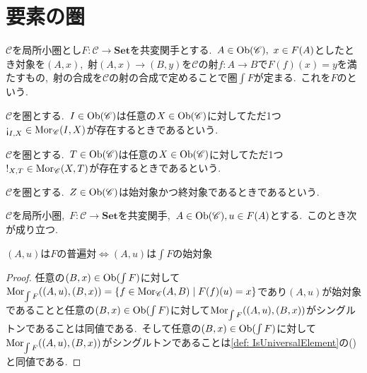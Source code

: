 
\section{要素の圏}

\begin{definition} \label{def: CategoryOfElements}
$\mathscr{C}$を局所小圏とし$F \colon \mathscr{C} \to \mathbf{Set}$を共変関手とする.\
$A \in \operatorname{Ob}(\mathscr{C}),\ x \in F(A)$としたとき対象を$(A, x)$,\ 射$(A, x) \to (B, y)$を$\mathscr{C}$の射$f \colon A \to B$で$F(f)(x) = y$を満たすもの,\ 射の合成を$\mathscr{C}$の射の合成で定めることで圏$\displaystyle \int F$が定まる.\
これを$F$のという.\
\end{definition}

\begin{definition} \label{def: IsInitialObject}
$\mathscr{C}$を圏とする.\
$I \in \operatorname{Ob}(\mathscr{C})$は任意の$X \in \operatorname{Ob}(\mathscr{C})$に対してただ1つ$\iexcl_{I, X} \in \Mor_\mathscr{C}(I,X)$が存在するときであるという.
\end{definition}

\begin{definition} \label{def: IsTerminalObject}
$\mathscr{C}$を圏とする.\
$T \in \operatorname{Ob}(\mathscr{C})$は任意の$X \in \operatorname{Ob}(\mathscr{C})$に対してただ1つ$!_{X, T} \in \operatorname{Mor}_\mathscr{C}(X, T)$が存在するときであるという.
\end{definition}

\begin{definition} \label{def: IsZeroObject}
$\mathscr{C}$を圏とする.\
$Z \in \operatorname{Ob}(\mathscr{C})$は始対象かつ終対象であるときであるという.
\end{definition}

\begin{proposition} \label{prop: universal_pair_iff_initial}
$\mathscr{C}$を局所小圏,\ $F \colon \mathscr{C} \to \mathbf{Set}$を共変関手,\ $A \in \operatorname{Ob}(\mathscr{C}), u \in F(A)$とする.\
このとき次が成り立つ.
\begin{center}
$(A, u)$は$F$の普遍対$\iff$$(A,u)$は$\displaystyle \int F$の始対象
\end{center}
\end{proposition}

\begin{proof}
任意の$(B,x) \in \operatorname{Ob}(\int F)$に対して$\operatorname{Mor}_{\int F}((A, u), (B, x)) = \{f \in \operatorname{Mor}_\mathscr{C}(A, B) \mid F(f)(u) = x\}$であり$(A, u)$が始対象であることと任意の$(B,x) \in \operatorname{Ob}(\int F)$に対して$\operatorname{Mor}_{\int F}((A, u), (B, x))$がシングルトンであることは同値である.\
そして任意の$(B,x) \in \operatorname{Ob}(\int F)$に対して$\operatorname{Mor}_{\int F}((A, u), (B, x))$がシングルトンであることは\cref{def: IsUniversalElement}の(\ast)と同値である.
\end{proof}
